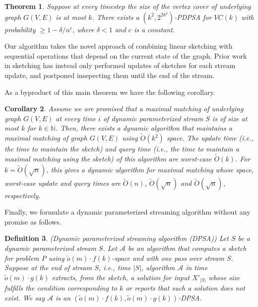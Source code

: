 \documentclass[11pt,letter]{article}
\newtheorem{theorem}{Theorem}
\newtheorem{corollary}[theorem]{Corollary}
\newtheorem{definition}[theorem]{Definition}
\newcommand{\NAT}{\ensuremath{\mathbb{N}}}
\newcommand{\NATURAL}{\NAT}
\begin{document}
\begin{theorem}
\label{thm:vc:max:k}
Suppose at every timestep
the size of the vertex cover of underlying graph $G(V,E)$ is at most $k$.
There exists a $(k^2,2^{2k^2})$-PDPSA for $VC(k)$ with probability $\ge 1-\delta/n^c$,
where $\delta<1$ and $c$ is a constant.
\end{theorem}

Our algorithm takes the novel approach of combining linear sketching
with sequential operations that depend on the current state of the
graph.
Prior work in sketching has instead only performed updates of sketches
for each stream update, and postponed insepecting them until the end
of the stream.


As a byproduct of this main theorem we have the following corollary.

\begin{corollary}
\label{cor:general:MM:dyn:promised}
Assume we are promised that a maximal matching of underlying graph $G(V,E)$
at every time $i$ of dynamic parameterized stream $S$ is of size
at most $k$ for $k\in \NATURAL$.
Then, there exists a dynamic algorithm that maintains
a maximal matching of graph $G(V,E)$ using $\tilde{O}(k^2)$ space.
The update time (i.e., the time to maintain the sketch)
and query time (i.e., the time to maintain a maximal matching using the sketch)
of this algorithm are worst-case $\tilde{O}(k)$. For $k=\tilde{O}(\sqrt{n})$,
this gives a dynamic  algorithm for maximal matching whose space,
worst-case update and query times
are $\tilde{O}(n)$, $\tilde{O}(\sqrt{n})$ and $\tilde{O}(\sqrt{n})$, respectively.
\end{corollary}




Finally, we formulate a dynamic parameterized streaming algorithm without any promise as follows.

\begin{definition}
({\sc Dynamic parameterized streaming algorithm (DPSA)})
\label{defn:dpsa}
Let $S$ be a dynamic parameterized stream $S$.
Let  $\mathcal{A}$ be an algorithm  that computes a sketch for problem $P$
using $\tilde{o}(m)\cdot f(k)$-space and with one pass over stream $S$.
Suppose at the end of stream $S$, i.e., time $|S|$, algorithm $\mathcal{A}$
in time $\tilde{o}(m)\cdot g(k)$ extracts,  from the sketch,
a solution for input $X'_{|S|}$ whose  size fulfills
the condition corresponding to $k$  or reports that such a solution does not exist.
We say $\mathcal{A}$ is an $(\tilde{o}(m)\cdot f(k),\tilde{o}(m)\cdot g(k))$-DPSA.
\end{definition}
\end{document}
